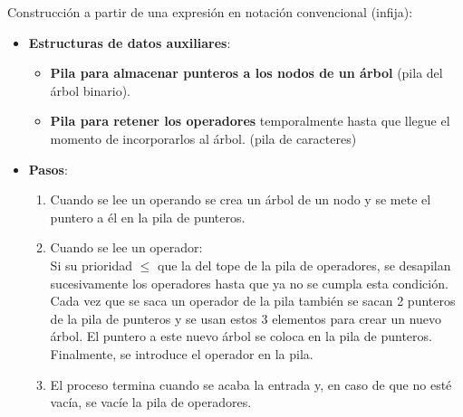 \documentclass{article}
\begin{document}
Construcción a partir de una expresión en notación convencional (infija):
\begin{itemize}
    \item \textbf{Estructuras de datos auxiliares}:
    \begin{itemize}
        \item \textbf{Pila para almacenar punteros a los nodos de un árbol} (pila del árbol binario).
        \item \textbf{Pila para retener los operadores} temporalmente hasta que llegue el momento de incorporarlos al árbol. (pila de caracteres)
    \end{itemize}

    \item \textbf{Pasos}:
    \begin{enumerate}
        \item Cuando se lee un operando se crea un árbol de un nodo y se mete el puntero a él en la pila de punteros.

        \item Cuando se lee un operador: \\
        Si su prioridad $\leq$ que la del tope de la pila de operadores, se desapilan sucesivamente los operadores hasta que ya no se cumpla esta condición. \\
        Cada vez que se saca un operador de la pila también se sacan 2 punteros de la pila de punteros y se usan estos 3 elementos para crear un nuevo árbol. El puntero a este nuevo árbol se coloca en la pila de punteros. \\
        Finalmente, se introduce el operador en la pila.

        \item El proceso termina cuando se acaba la entrada y, en caso de que no esté vacía, se vacíe la pila de operadores.
    \end{enumerate}
\end{itemize}
\end{document}

